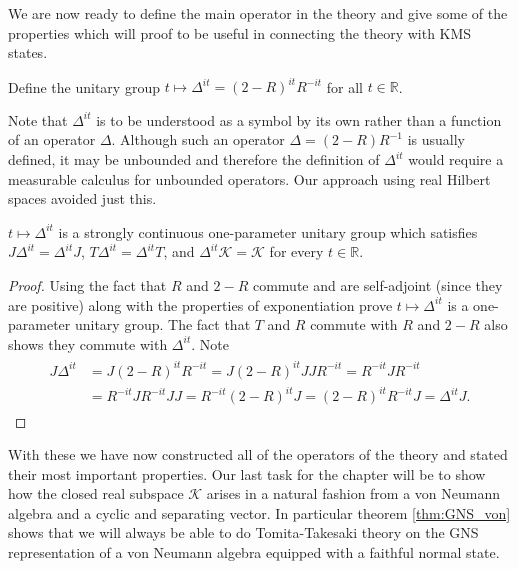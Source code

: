 We are now ready to define the main operator in the theory and give some of the properties which will proof to be useful in connecting the theory with KMS states.

\begin{definition}
Define the unitary group $t\mapsto\Delta^{it} = (2-R)^{it}R^{-it}$ for all $t\in\mathbb{R}$.
\end{definition}

Note that $\Delta^{it}$ is to be understood as a symbol by its own rather than a function of an operator $\Delta$. Although such an operator $\Delta=(2-R)R^{-1}$ is usually defined, it may be unbounded and therefore the definition of $\Delta^{it}$ would require a measurable calculus for unbounded operators. Our approach using real Hilbert spaces avoided just this.

\begin{theorem}
$t\mapsto\Delta^{it}$ is a strongly continuous one-parameter unitary group which satisfies $J\Delta^{it}=\Delta^{it}J$, $T\Delta^{it}=\Delta^{it}T$, and $\Delta^{it}\mathcal{K}=\mathcal{K}$ for every $t\in\mathbb{R}$.
\end{theorem}

\begin{proof}
Using the fact that $R$ and $2-R$ commute and are self-adjoint (since they are positive) along with the properties of exponentiation prove $t\mapsto\Delta^{it}$ is a one-parameter unitary group. The fact that $T$ and $R$ commute with $R$ and $2-R$ also shows they commute with $\Delta^{it}$. Note
\begin{align}
\begin{split}
J\Delta^{it}&=J(2-R)^{it}R^{-it}=J(2-R)^{it}JJR^{-it}=R^{-it}JR^{-it} \\
&=R^{-it}JR^{-it}JJ=R^{-it}(2-R)^{it}J=(2-R)^{it} R^{-it}J=\Delta^{it}J.
\end{split}
\end{align}
\end{proof}

With these we have now constructed all of the operators of the theory and stated their most important properties. Our last task for the chapter will be to show how the closed real subspace $\mathcal{K}$ arises in a natural fashion from a von Neumann algebra and a cyclic and separating vector. In particular theorem \ref{thm:GNS_von} shows that we will always be able to do Tomita-Takesaki theory on the GNS representation of a von Neumann algebra equipped with a faithful normal state.

